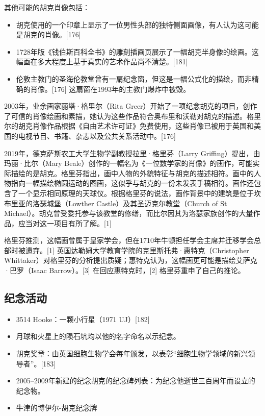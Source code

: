 其他可能的胡克肖像包括：
\begin{itemize}
\item 胡克使用的一个印章上显示了一位男性头部的独特侧面画像，有人认为这可能是胡克的肖像。[176]
\item 1728年版《钱伯斯百科全书》的雕刻插画页展示了一幅胡克半身像的绘画。这幅画在多大程度上基于真实的艺术作品尚不清楚。[181]
\item 伦敦主教门的圣海伦教堂曾有一扇纪念窗，但这是一幅公式化的描绘，而非精确的肖像。[176] 这扇窗在1993年的主教门爆炸中被毁。
\end{itemize}
2003年，业余画家丽塔·格里尔（Rita Greer）开始了一项纪念胡克的项目，创作了可信的肖像绘画和素描，她认为这些作品符合奥布里和沃勒对胡克的描述。格里尔的胡克肖像作品根据《自由艺术许可证》免费使用，这些肖像已被用于英国和美国的电视节目、书籍、杂志以及公共关系活动中。[176]

2019年，德克萨斯农工大学生物学副教授拉里·格里芬（Larry Griffing）提出，由玛丽·比尔（Mary Beale）创作的一幅名为《一位数学家的肖像》的画作，可能实际描绘的是胡克。格里芬指出，画中人物的外貌特征与胡克的描述相符。画中的人物指向一幅描绘椭圆运动的图画，这似乎与胡克的一份未发表手稿相符。画作还包含了一个显示相同原理的天球仪。根据格里芬的说法，画作背景中的建筑是位于坎布里亚的洛瑟城堡（Lowther Castle）及其圣迈克尔教堂（Church of St Michael）。胡克曾受委托参与该教堂的修缮，而比尔因其为洛瑟家族创作的大量作品，应当对这一项目有所了解。[1]

格里芬推测，这幅画曾属于皇家学会，但在1710年牛顿担任学会主席并迁移学会总部时被遗弃。[1] 英国达勒姆大学教育学院的克里斯托弗·惠特克（Christopher Whittaker）对格里芬的分析提出质疑；惠特克认为，这幅画更可能是描绘艾萨克·巴罗（Isaac Barrow）。[3] 在回应惠特克时，[2] 格里芬重申了自己的推论。
\subsection{纪念活动}
\begin{itemize}
\item 3514 Hooke：一颗小行星（1971 UJ）[182]  
\item 月球和火星上的陨石坑均以他的名字命名以示纪念。  
\item 胡克奖章：由英国细胞生物学会每年颁发，以表彰“细胞生物学领域的新兴领导者”。[183]  
\item 2005–2009年新建的纪念胡克的纪念碑列表：为纪念他逝世三百周年而设立的纪念物。  
\item 牛津的博伊尔-胡克纪念牌
\end{itemize}
